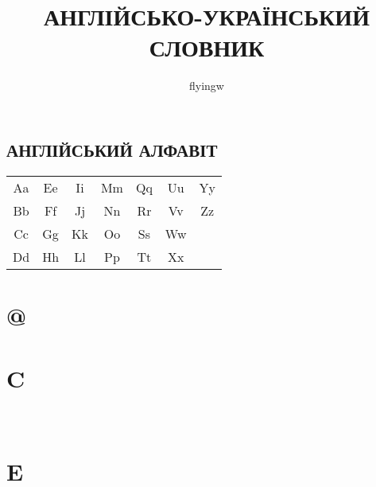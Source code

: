 


\title{\uppercase{Англійсько-український\\словник}}
\author{flyingw}
\maketitle

\thispagestyle{empty}
\clearpage

\begin{center}
\section{\uppercase{Англійський алфавіт}}
\begin{tabular}{| c c c c c c c |}
  \hline
  Aa & Ee & Ii & Mm & Qq & Uu & Yy \\
  Bb & Ff & Jj & Nn & Rr & Vv & Zz \\
  Cc & Gg & Kk & Oo & Ss & Ww &    \\
  Dd & Hh & Ll & Pp & Tt & Xx &    \\
  \hline
\end{tabular}
\end{center}

\thispagestyle{empty}
\clearpage

\begin{twocolumn}

\section{@}


\section{C}

\\

\section{E}


\end{twocolumn}

